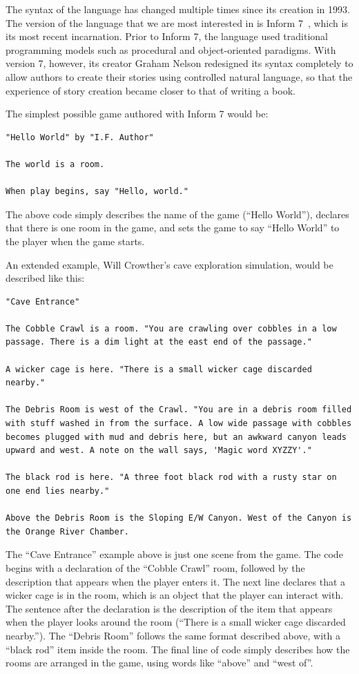 \documentclass[11pt]{report}
\begin{document}
The syntax of the language has changed multiple times since its creation in
1993. The version of the language that we are most interested in is Inform 7~\citep{reed2010creating},
which is its most recent incarnation. Prior to Inform 7, the language used
traditional programming models such as procedural and object-oriented paradigms.
With version 7, however, its creator Graham Nelson redesigned its
syntax completely to allow authors to create their stories using controlled
natural language, so that the experience of story creation became closer to that
of writing a book.

The simplest possible game authored with Inform 7 would be:

\begin{lstlisting}[showstringspaces=false]
"Hello World" by "I.F. Author"

The world is a room.

When play begins, say "Hello, world."
\end{lstlisting}

The above code simply describes the name of the game (``Hello World''), declares
that there is one room in the game, and sets the game to say ``Hello World'' to
the player when the game starts.

An extended example, Will Crowther's cave exploration simulation, would be
described like this:

\begin{lstlisting}[showstringspaces=false]
"Cave Entrance"

The Cobble Crawl is a room. "You are crawling over cobbles in a low passage. There is a dim light at the east end of the passage."

A wicker cage is here. "There is a small wicker cage discarded nearby."

The Debris Room is west of the Crawl. "You are in a debris room filled with stuff washed in from the surface. A low wide passage with cobbles becomes plugged with mud and debris here, but an awkward canyon leads upward and west. A note on the wall says, 'Magic word XYZZY'."

The black rod is here. "A three foot black rod with a rusty star on one end lies nearby."

Above the Debris Room is the Sloping E/W Canyon. West of the Canyon is the Orange River Chamber.
\end{lstlisting}

The ``Cave Entrance'' example above is just one scene from the game. The code
begins with a declaration of the ``Cobble Crawl'' room, followed by the
description that appears when the player enters it. The next line declares that
a wicker cage is in the room, which is an object that the player can interact
with. The sentence after the declaration is the description of the item that
appears when the player looks around the room (``There is a small wicker cage
discarded nearby.'').
The ``Debris Room'' follows the same format described above, with a ``black
rod'' item inside the room. The final line of code simply describes how the
rooms are arranged in the game, using words like ``above'' and ``west of''.
\end{document}
